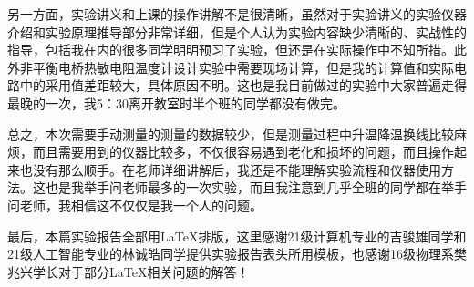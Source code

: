\documentclass[12pt]{article}
\begin{document}
另一方面，实验讲义和上课的操作讲解不是很清晰，虽然对于实验讲义的实验仪器介绍和实验原理推导部分非常详细，但是个人认为实验内容缺少清晰的、实战性的指导，包括我在内的很多同学明明预习了实验，但还是在实际操作中不知所措。此外非平衡电桥热敏电阻温度计设计实验中需要现场计算，但是我的计算值和实际电路中的采用值差距较大，具体原因不明。这也是我目前做过的实验中大家普遍走得最晚的一次，我5：30离开教室时半个班的同学都没有做完。

总之，本次需要手动测量的测量的数据较少，但是测量过程中升温降温换线比较麻烦，而且需要用到的仪器比较多，不仅很容易遇到老化和损坏的问题，而且操作起来也没有那么顺手。在老师详细讲解后，我还是不能理解实验流程和仪器使用方法。这也是我举手问老师最多的一次实验，而且我注意到几乎全班的同学都在举手问老师，我相信这不仅仅是我一个人的问题。

最后，本篇实验报告全部用\LaTeX{}排版，这里感谢21级计算机专业的吉骏雄同学和21级人工智能专业的林诚皓同学提供实验报告表头所用模板，也感谢16级物理系樊兆兴学长对于部分\LaTeX{}相关问题的解答！
\end{document}
